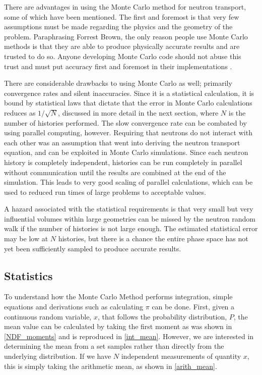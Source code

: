 There are advantages in using the Monte Carlo method for neutron transport, some of which have been mentioned.  The first and foremost is that very few assumptions must be made regarding the physics and the geometry of the problem. Paraphrasing Forrest Brown, the only reason people use Monte Carlo methods is that they are able to produce physically accurate results and are trusted to do so.  Anyone developing Monte Carlo code should not abuse this trust and must put accuracy first and foremost in their implementations \cite{fb_snamc}.

There are considerable drawbacks to using Monte Carlo as well; primarily convergence rates and silent inaccuracies.  Since it is a statistical calculation, it is bound by statistical laws that dictate that the error in Monte Carlo calculations reduces as $1/\sqrt{N}$, discussed in more detail in the next section, where $N$ is the number of histories performed.  The slow convergence rate can be combated by using parallel computing, however.  Requiring that neutrons do not interact with each other was an assumption that went into deriving the neutron transport equation, and can be exploited in Monte Carlo simulations.  Since each neutron history is completely independent, histories can be run completely in parallel without communication until the results are combined at the end of the simulation.  This leads to very good scaling of parallel calculations, which can be used to reduced run times of large problems to acceptable values.

A hazard associated with the statistical requirements is that very small but very influential volumes within large geometries can be missed by the neutron random walk if the number of histories is not large enough.  The estimated statistical error may be low at $N$ histories, but there is a chance the entire phase space has not yet been sufficiently sampled to produce accurate results.  

\subsection{Statistics}
\label{sec:stat}

To understand how the Monte Carlo Method performs integration, simple equations and derivations such as calculating $\pi$ can be done.   First, given a continuous random variable, $x$, that follows the probability distribution, $P$, the mean value can be calculated by taking the first moment as was shown in \eqref{NDF_moments} and is reproduced in \eqref{int_mean}.  However, we are interested in determining the mean from a set samples rather than directly from the underlying distribution.  If we have $N$ independent measurements of quantity $x$, this is simply taking the arithmetic mean, as shown in \eqref{arith_mean}.

